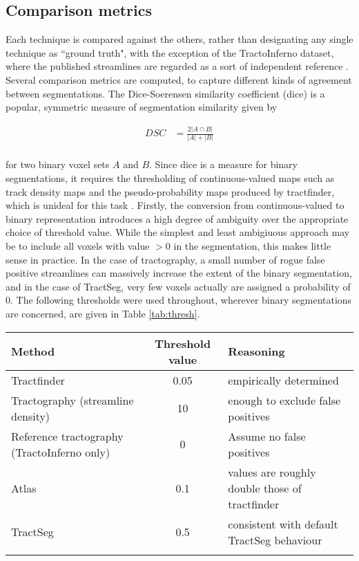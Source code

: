 \subsection{Comparison metrics}

Each technique is compared against the others, rather than designating any single technique as ``ground truth", with the exception of the TractoInferno dataset, where the published streamlines are regarded as a sort of independent reference .
Several comparison metrics are computed, to capture different kinds of agreement between segmentations.
The Dice-Soerensen similarity coefficient (\gls{dice}) \autocite{Dice1945} is a popular, symmetric measure of segmentation similarity given by

\begin{align}
  DSC &= \frac{2 |A \cap B|}{|A| + |B|} \\
\end{align}

for two binary voxel sets $A$ and $B$.
Since \gls{dice} is a measure for binary segmentations, it requires the thresholding of continuous-valued maps such as track density maps and the pseudo-probability maps produced by tractfinder, which is unideal for this task .
Firstly, the conversion from continuous-valued to binary representation introduces a high degree of ambiguity over the appropriate choice of threshold value.
While the simplest and least ambigiuous approach may be to include all voxels with value $>0$ in the segmentation, this makes little sense in practice.
In the case of tractography, a small number of rogue false positive streamlines can massively increase the extent of the binary segmentation, and in the case of TractSeg, very few voxels actually are assigned a probability of 0.
The following thresholds were used throughout, wherever binary segmentations are concerned, are given in Table \ref{tab:thresh}.

\begin{tabularx}{\textwidth}{X c X}
  Method    & Threshold value & Reasoning \\
  \hline
  Tractfinder   & 0.05 & empirically determined \\
  Tractography (streamline density) & 10 & enough to exclude false positives \\
  Reference tractography (TractoInferno only) & 0 & Assume no false positives \\
  Atlas         & 0.1 & values are roughly double those of tractfinder \\
  TractSeg      & 0.5 & consistent with default TractSeg behaviour \\
  \hline
  \vspace{\baselineskip}
\end{tabularx}

